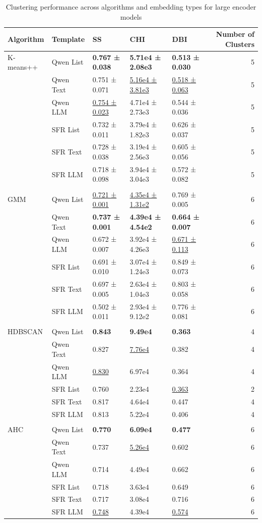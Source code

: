 \begin{table}[!h]
\centering
\caption{Clustering performance across algorithms and embedding types for large encoder models}
\centering
\begin{tabular}[t]{lllllr}
\toprule
Algorithm & Template & SS & CHI & DBI & Number of Clusters\\
\midrule
K-means++ & Qwen List & \textbf{0.767 ± 0.038} & \textbf{5.71e4 ± 2.08e3} & \textbf{0.513 ± 0.030} & 5\\
 & Qwen Text & 0.751 ± 0.071 & \underline{5.16e4 ± 3.81e3} & \underline{0.518 ± 0.063} & 5\\
 & Qwen LLM & \underline{0.754 ± 0.023} & 4.71e4 ± 2.73e3 & 0.544 ± 0.036 & 5\\
 & SFR List & 0.732 ± 0.011 & 3.79e4 ± 1.82e3 & 0.626 ± 0.037 & 5\\
 & SFR Text & 0.728 ± 0.038 & 3.19e4 ± 2.56e3 & 0.605 ± 0.056 & 5\\
\addlinespace
 & SFR LLM & 0.718 ± 0.098 & 3.94e4 ± 3.04e3 & 0.572 ± 0.082 & 5\\
\midrule\\
GMM & Qwen List & \underline{0.721 ± 0.001} & \underline{4.35e4 ± 1.31e2} & 0.769 ± 0.005 & 6\\
 & Qwen Text & \textbf{0.737 ± 0.001} & \textbf{4.39e4 ± 4.54e2} & \textbf{0.664 ± 0.007} & 6\\
 & Qwen LLM & 0.672 ± 0.007 & 3.92e4 ± 4.26e3 & \underline{0.671 ± 0.113} & 6\\
 & SFR List & 0.691 ± 0.010 & 3.07e4 ± 1.24e3 & 0.849 ± 0.073 & 6\\
\addlinespace
 & SFR Text & 0.697 ± 0.005 & 2.63e4 ± 1.04e3 & 0.803 ± 0.058 & 6\\
 & SFR LLM & 0.502 ± 0.011 & 2.93e4 ± 9.12e2 & 0.776 ± 0.081 & 6\\
\midrule\\
HDBSCAN & Qwen List & \textbf{0.843} & \textbf{9.49e4} & \textbf{0.363} & 4\\
 & Qwen Text & 0.827 & \underline{7.76e4} & 0.382 & 4\\
 & Qwen LLM & \underline{0.830} & 6.97e4 & 0.364 & 4\\
\addlinespace
 & SFR List & 0.760 & 2.23e4 & \underline{0.363} & 2\\
 & SFR Text & 0.817 & 4.64e4 & 0.447 & 4\\
 & SFR LLM & 0.813 & 5.22e4 & 0.406 & 4\\
\midrule\\
AHC & Qwen List & \textbf{0.770} & \textbf{6.09e4} & \textbf{0.477} & 6\\
 & Qwen Text & 0.737 & \underline{5.26e4} & 0.602 & 6\\
\addlinespace
 & Qwen LLM & 0.714 & 4.49e4 & 0.662 & 6\\
 & SFR List & 0.718 & 3.63e4 & 0.649 & 6\\
 & SFR Text & 0.717 & 3.08e4 & 0.716 & 6\\
 & SFR LLM & \underline{0.748} & 4.39e4 & \underline{0.574} & 6\\
\midrule
\bottomrule
\end{tabular}
\end{table}
